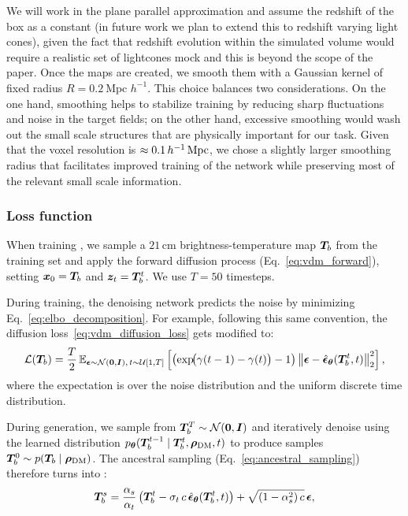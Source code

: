 We will work in the plane parallel approximation and assume the redshift of the box as a constant (in future work we plan to extend this to redshift varying light cones), given the fact that redshift evolution within the simulated volume would require a realistic set of lightcones mock and this is beyond the scope of the paper.
Once the maps are created, we smooth them with a Gaussian kernel of fixed radius $R = 0.2 ~\text{Mpc $h$}^{-1}$. This choice balances two considerations. On the one hand, smoothing helps to stabilize training by reducing sharp fluctuations and noise in the target fields; on the other hand, excessive smoothing would wash out the small scale structures that are physically important for our task. Given that the voxel resolution is $\approx 0.1 \,h^{-1}\,\mathrm{Mpc}$, we chose a slightly larger smoothing radius that facilitates improved training of the network while preserving most of the relevant small scale information.




\subsubsection{Loss function}
\label{sec:lodi_loss}

When training \LODI, we sample a $21\,\mathrm{cm}$ brightness-temperature map $\bm{T}_b$ from the training set and apply the forward diffusion process (Eq.~\ref{eq:vdm_forward}), setting $\bm{x}_0 = \bm{T}_b$ and $\bm{z}_t = \bm{T}_b^t$. We use $T = 50$ timesteps.

During training, the denoising network predicts the noise by minimizing Eq.~\ref{eq:elbo_decomposition}. For example, following this same convention, the diffusion loss~\ref{eq:vdm_diffusion_loss} gets modified to:
\begin{equation}
\label{eq:lodi_loss_diffusion}
    \mathcal{L}(\bm{T}_b) = \frac{T}{2} \, \mathbb{E}_{\bm{\epsilon} \sim \mathcal{N}(\bm{0},\bm{I}),\, t \sim \mathcal{U}[1,T]}
    \left[ \bigl(\exp\!\bigl(\gamma(t-1) - \gamma(t)\bigr) - 1\bigr)
    \left\|\bm{\epsilon} - \hat{\bm{\epsilon}}_{\bm{\theta}}(\bm{T}_b^t, t)\right\|_2^2 \right],
\end{equation}
where the expectation is over the noise distribution and the uniform discrete
time distribution.

During generation, we sample from $\bm{T}_b^T \sim \mathcal{N}(\bm{0},\bm{I})$ and
iteratively denoise using the learned distribution
$p_{\bm{\theta}}(\bm{T}_b^{t-1} \mid \bm{T}_b^t, \boldsymbol{\rho}_\mathrm{DM}, t)$ to produce
samples $\bm{T}_b^0 \sim p(\bm{T}_b \mid \boldsymbol{\rho}_\mathrm{DM})$. The ancestral sampling (Eq.~\ref{eq:ancestral_sampling}) therefore turns into :
\begin{equation}
\label{eq:lodi_ancestral}
    \bm{T}_b^s = \frac{\alpha_s}{\alpha_t}\left(\bm{T}_b^t - \sigma_t\,c\,\hat{\bm{\epsilon}}_{\bm{\theta}}(\bm{T}_b^t, t)\right)
    + \sqrt{(1-\alpha_s^2)\,c}\,\bm{\epsilon},
\end{equation}


